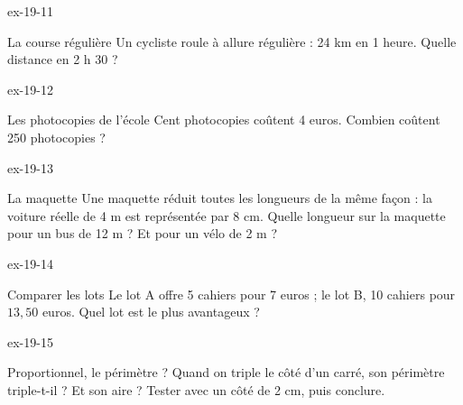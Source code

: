 \begin{blocLivre}{ex-19-11}\begin{exercice}[3]{La course régulière}
Un cycliste roule à allure régulière : 24 km en 1 heure. Quelle distance en 2 h 30 ?
\end{exercice}\end{blocLivre}
\begin{blocLivre}{ex-19-12}\begin{exercice}[3]{Les photocopies de l’école}
Cent photocopies coûtent 4 euros. Combien coûtent 250 photocopies ?
\end{exercice}\end{blocLivre}
\begin{blocLivre}{ex-19-13}\begin{exercice}[3]{La maquette}
Une maquette réduit toutes les longueurs de la même façon : la voiture réelle de 4 m est représentée par 8 cm. Quelle longueur sur la maquette pour un bus de 12 m ? Et pour un vélo de 2 m ?
\end{exercice}\end{blocLivre}
\begin{blocLivre}{ex-19-14}\begin{exercice}[3]{Comparer les lots}
Le lot A offre 5 cahiers pour 7 euros ; le lot B, 10 cahiers pour $13{,}50$ euros. Quel lot est le plus avantageux ?
\end{exercice}\end{blocLivre}
\begin{blocLivre}{ex-19-15}\begin{exercice}[3]{Proportionnel, le périmètre ?}
Quand on triple le côté d’un carré, son périmètre triple-t-il ? Et son aire ? Tester avec un côté de 2 cm, puis conclure.
\end{exercice}\end{blocLivre}

\clearpage
